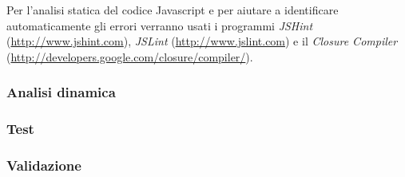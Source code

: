 		Per l'analisi statica del codice Javascript e per aiutare a identificare automaticamente gli errori verranno usati i programmi \emph{JSHint} (\url{http://www.jshint.com}), \emph{JSLint} (\url{http://www.jslint.com}) e il \emph{Closure Compiler} (\url{http://developers.google.com/closure/compiler/}).
		
		\subsubsection{Analisi dinamica}
		\subsubsection{Test}
		\subsubsection{Validazione}
